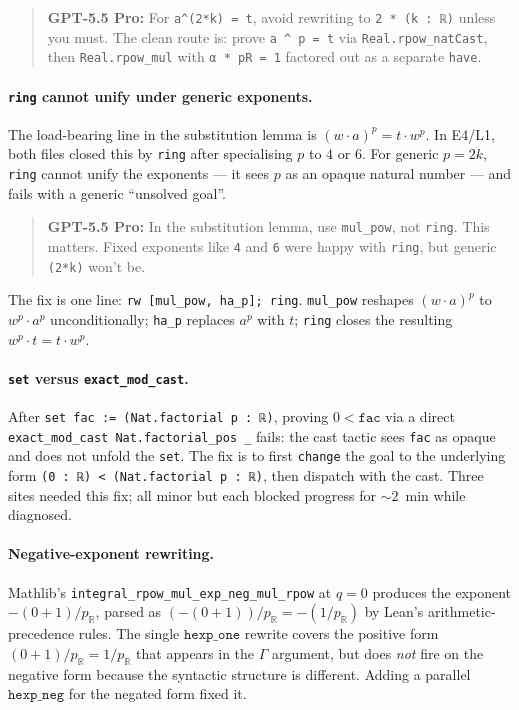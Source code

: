 \documentclass[11pt]{article}
\newcommand{\gptbox}[1]{\par\medskip\begin{quote}\small\textbf{\textcolor{green!50!black}{GPT-5.5 Pro:}} #1\end{quote}\medskip}
\begin{document}
\gptbox{For \texttt{a\textasciicircum{}(2*k) = t}, avoid rewriting to
\texttt{2 * (k : ℝ)} unless you must. The clean route is: prove
\texttt{a \textasciicircum{} p = t} via
\texttt{Real.rpow\_natCast}, then \texttt{Real.rpow\_mul} with
\texttt{α * pR = 1} factored out as a separate \texttt{have}.}

\paragraph{\texttt{ring} cannot unify under generic exponents.} The
load-bearing line in the substitution lemma is
$(w\cdot a)^p = t \cdot w^p$. In E4/L1, both files closed this by
\texttt{ring} after specialising $p$ to $4$ or $6$. For generic
$p = 2k$, \texttt{ring} cannot unify the exponents — it sees $p$ as
an opaque natural number — and fails with a generic ``unsolved
goal''.

\gptbox{In the substitution lemma, use \texttt{mul\_pow}, not
\texttt{ring}. This matters. Fixed exponents like \texttt{4} and
\texttt{6} were happy with \texttt{ring}, but generic
\texttt{(2*k)} won't be.}

\noindent The fix is one line: \texttt{rw [mul\_pow, ha\_p]; ring}.
\texttt{mul\_pow} reshapes $(w\cdot a)^p$ to $w^p \cdot a^p$
unconditionally; \texttt{ha\_p} replaces $a^p$ with $t$;
\texttt{ring} closes the resulting $w^p \cdot t = t \cdot w^p$.

\paragraph{\texttt{set} versus \texttt{exact\_mod\_cast}.}
After \texttt{set fac := (Nat.factorial p : ℝ)}, proving
$0 < \texttt{fac}$ via a direct
\texttt{exact\_mod\_cast Nat.factorial\_pos \_}
fails: the cast tactic sees \texttt{fac} as opaque
and does not unfold the \texttt{set}. The fix is to first
\texttt{change} the goal to the underlying form
\texttt{(0 : ℝ) < (Nat.factorial p : ℝ)}, then dispatch with the
cast. Three sites needed this fix; all minor but each blocked
progress for ${\sim}2$~min while diagnosed.

\paragraph{Negative-exponent rewriting.} Mathlib's
\texttt{integral\_rpow\_mul\_exp\_neg\_mul\_rpow} at $q=0$ produces
the exponent $-(0+1)/p_{\mathbb R}$, parsed as
$(-(0+1))/p_{\mathbb R} = -(1/p_{\mathbb R})$ by Lean's
arithmetic-precedence rules. The single $\mathtt{hexp\_one}$
rewrite covers the positive form $(0+1)/p_{\mathbb R} = 1/p_{\mathbb R}$
that appears in the $\Gamma$ argument, but does \emph{not} fire on
the negative form because the syntactic structure is different.
Adding a parallel $\mathtt{hexp\_neg}$ for the negated form fixed it.
\end{document}
